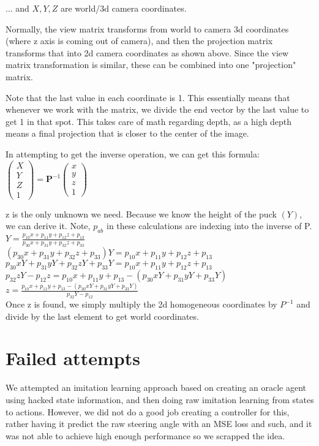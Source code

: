 \documentclass{article}
\begin{document}
... and $X,Y,Z$ are world/3d camera coordinates.

Normally, the view matrix transforms from world to camera 3d coordinates (where z axis is coming out of camera), and then the projection matrix transforms that into 2d camera coordinates as shown above. Since the view matrix transformation is similar, these can be combined into one "projection" matrix.

Note that the last value in each coordinate is 1. This essentially means that whenever we work with the matrix, we divide the end vector by the last value to get 1 in that spot. This takes care of math regarding depth, as a high depth means a final projection that is closer to the center of the image.

In attempting to get the inverse operation, we can get this formula:
$\begin{pmatrix} X \\ Y \\ Z \\ 1\end{pmatrix} = 
\textbf{P}^{-1} \begin{pmatrix} x \\ y \\ z \\ 1\end{pmatrix}
$

z is the only unknown we need. Because we know the height of the puck $(Y)$, we can derive it. Note, $p_{ab}$ in these calculations are indexing into the inverse of P.\\
$Y = \frac{p_{10}x + p_{11}y + p_{12}z + p_{13}}{p_{30}x + p_{31}y + p_{32}z + p_{33}}$\\
$(p_{30}x + p_{31}y + p_{32}z + p_{33}) Y = p_{10}x + p_{11}y + p_{12}z + p_{13}$\\
$p_{30}xY + p_{31}yY + p_{32}zY + p_{33}Y = p_{10}x + p_{11}y + p_{12}z + p_{13}$\\
$p_{32}zY -  p_{12}z  = p_{10}x + p_{11}y + p_{13} - (p_{30}xY + p_{31}yY +p_{33}Y) $\\
$z =\frac{p_{10}x + p_{11}y + p_{13} - (p_{30}xY + p_{31}yY +p_{33}Y)}{p_{32}Y - p_{12} } $\\

Once z is found, we simply multiply the 2d homogeneous coordinates by $P^{-1}$ and divide by the last element to get world coordinates.

\section{Failed attempts}
We attempted an imitation learning approach based on creating an oracle agent using hacked state information, and then doing raw imitation learning from states to actions. However, we did not do a good job creating a controller for this, rather having it predict the raw steering angle with an MSE loss and such, and it was not able to achieve high enough performance so we scrapped the idea.
\end{document}
